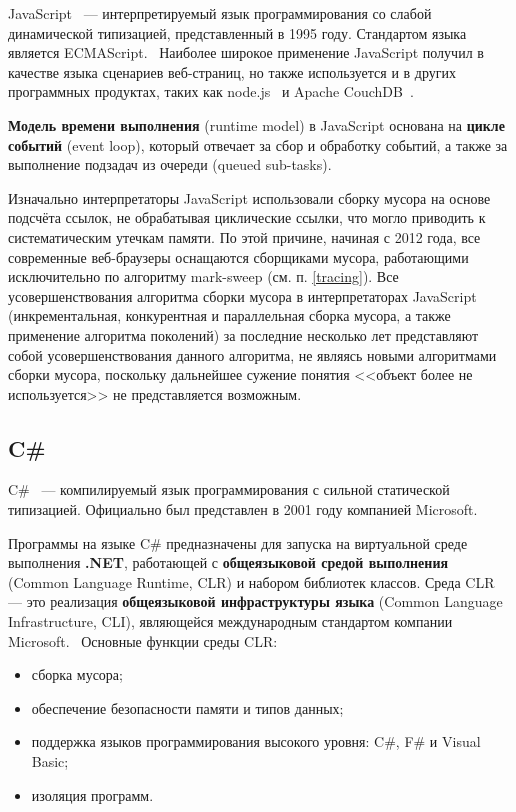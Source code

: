 JavaScript~\cite{js} --- интерпретируемый язык программирования со слабой динамической типизацией, представленный в 1995 году. Стандартом языка является ECMAScript.~\cite{ecmascript} Наиболее широкое применение JavaScript получил в качестве языка сценариев веб-страниц, но также используется и в других программных продуктах, таких как node.js~\cite{node_js} и Apache CouchDB~\cite{couchdb}.

\textbf{Модель времени выполнения} (runtime model) в JavaScript основана на \textbf{цикле событий} (event loop), который отвечает за сбор и обработку событий, а также за выполнение подзадач из очереди (queued sub-tasks).~\cite{js_event_loop}

Изначально интерпретаторы JavaScript использовали сборку мусора на основе подсчёта ссылок, не обрабатывая циклические ссылки, что могло приводить к систематическим утечкам памяти. По этой причине, начиная с 2012 года, все современные веб-браузеры оснащаются сборщиками мусора, работающими исключительно по алгоритму mark-sweep (см. п. \ref{tracing}). Все усовершенствования алгоритма сборки мусора в интерпретаторах JavaScript (инкрементальная, конкурентная и параллельная сборка мусора, а также применение алгоритма поколений) за последние несколько лет представляют собой усовершенствования данного алгоритма, не являясь новыми алгоритмами сборки мусора, поскольку дальнейшее сужение понятия <<объект более не используется>> не представляется возможным.~\cite{js_memory}

\subsection{C\#}

C\#~\cite{dotnet_tour} --- компилируемый язык программирования с сильной статической типизацией. Официально был представлен в 2001 году компанией Microsoft.

Программы на языке C\# предназначены для запуска на виртуальной среде выполнения \textbf{.NET}, работающей с \textbf{общеязыковой средой выполнения} (Common Language Runtime, CLR) и набором библиотек классов. Среда CLR --- это реализация \textbf{общеязыковой инфраструктуры языка} (Common Language Infrastructure, CLI), являющейся международным стандартом компании Microsoft.~\cite{dotnet_tour} Основные функции среды CLR:~\cite{dotnet_intro}~\cite{dotnet_clr_intro}

\begin{itemize}[label*=---]
	\item сборка мусора;
	\item обеспечение безопасности памяти и типов данных;
	\item поддержка языков программирования высокого уровня: C\#, F\# и Visual Basic;
	\item изоляция программ.
\end{itemize}

